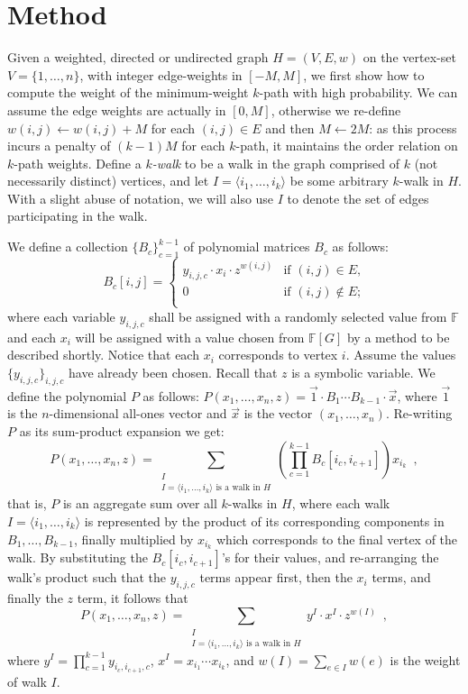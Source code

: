 \documentclass{llncs}
\newcommand{\FF}{\mathbb{F}}
\newcommand{\FG}{{\FF[G]}}
\begin{document}
\section{Method}\label{sec:method}
Given a weighted, directed or undirected graph $H=(V,E,w)$ on the vertex-set $V = \{1,\ldots,n\}$, with integer edge-weights in $[-M,M]$, we first show how to compute the weight of the minimum-weight $k$-path with high probability. We can assume the edge weights are actually in $[0,M]$, otherwise we re-define $w(i,j) \gets w(i,j) + M$ for each $(i,j) \in E$ and then $M \gets 2M$: as this process incurs a penalty of $(k-1)M$ for each $k$-path, it maintains the order relation on $k$-path weights.
Define a \emph{$k$-walk} to be a walk in the graph comprised of $k$ (not necessarily distinct) vertices, and let $I = \langle i_1,\ldots,i_k \rangle$ be some arbitrary $k$-walk in $H$. With a slight abuse of notation, we will also use $I$ to denote the set of edges participating in the walk.

We define a collection $\{B_c\}_{c=1}^{k-1}$ of polynomial matrices $B_c$ as follows: 
\begin{equation} B_c[i,j]=\begin{cases}
y_{i,j,c} \cdot x_i \cdot z^{w(i,j)} & \text{if $(i,j) \in E$,}\\
0 & \text{if $(i,j) \notin E$;}\\
\end{cases} \end{equation} 
where each variable $y_{i,j,c}$ shall be assigned with a randomly selected value from $\FF $ and each $x_i$ will be assigned with a value chosen from $\FG$ by a method to be described shortly. Notice that each $x_i$ corresponds to vertex $i$. Assume the values $\{y_{i,j,c}\}_{{i,j,c}}$ have already been chosen. Recall that $z$ is a symbolic variable. We define the polynomial $P$ as follows: $P(x_1, \ldots, x_n, z) = \vec{1} \cdot  B_1  \cdots B_{k-1} \cdot\vec{x}$, where $\vec{1}$ is the $n$-dimensional all-ones vector and $\vec{x}$ is the vector $(x_1, \ldots, x_n)$. 
Re-writing $P$ as its sum-product expansion we get:
\begin{equation}
P(x_1, \ldots, x_n, z) = \sum_{\substack{I\\I=\langle i_1,\ldots,i_k \rangle \text{ is a walk in }H}}\left(\prod_{c=1}^{k-1} B_c[i_c,i_{c+1}]\right)x_{i_k}\enspace,
\end{equation}
that is, $P$ is an aggregate sum over all $k$-walks in $H$, where each walk $I=\langle i_1,\ldots,i_k \rangle $ is represented by the product of its corresponding components in $B_1,\ldots, B_{k-1}$, finally multiplied by $x_{i_k}$ which corresponds to the final vertex of the walk. By substituting the $B_c[i_c,i_{c+1}]$'s for their values, and re-arranging the walk's product such that the $y_{i,j,c}$ terms appear first, then the $x_i$ terms, and finally the $z$ term, it follows that
\begin{equation}
P(x_1, \ldots, x_n, z) = \sum_{\substack{I\\I=\langle i_1,\ldots,i_k \rangle \text{ is a walk in }H}} y^I \cdot x^I \cdot z^{w(I)}\enspace,
\end{equation}
where $y^I = \prod_{c=1}^{k-1} y_{i_c, i_{c+1}, c}$, $x^I = x_{i_1} \cdots x_{i_k}$, and $w(I) = \sum_{e \in I}w(e)$ is the weight of walk $I$.
\end{document}

